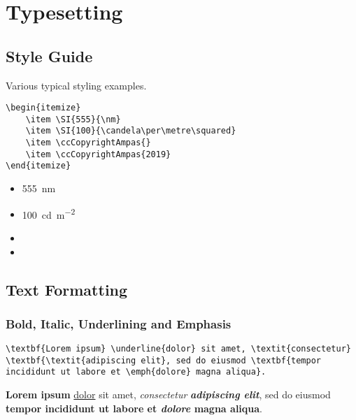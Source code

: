 \chapter*{Typesetting}%
\label{ch:typesetting}

\section*{Style Guide}%
\label{sec:style-guide}

Various typical styling examples.

\begin{lstlisting}[caption={Various style examples.}]
\begin{itemize}
    \item \SI{555}{\nm}
    \item \SI{100}{\candela\per\metre\squared}
    \item \ccCopyrightAmpas{}
    \item \ccCopyrightAmpas{2019}
\end{itemize}
\end{lstlisting}

\begin{itemize}
    \item \SI{555}{\nm}
    \item \SI{100}{\candela\per\metre\squared}
    \item \ccCopyrightAmpas{}
    \item {}
\end{itemize}

\section*{Text Formatting}%
\label{sec:text-formatting}

\subsection*{Bold, Italic, Underlining and Emphasis}%
\label{subsec:bold-italic-underlining-and-emphasis}

\begin{lstlisting}[caption={Bold, italic, underlining and emphasis.}]
\textbf{Lorem ipsum} \underline{dolor} sit amet, \textit{consectetur} \textbf{\textit{adipiscing elit}, sed do eiusmod \textbf{tempor incididunt ut labore et \emph{dolore} magna aliqua}.
\end{lstlisting}

\textbf{Lorem ipsum} \underline{dolor} sit amet, \textit{consectetur} \textbf{\textit{adipiscing elit}}, sed do eiusmod \textbf{tempor incididunt ut labore et \emph{dolore} magna aliqua}.

